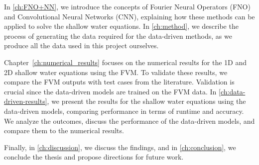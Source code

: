 In \autoref{ch:FNO+NN}, we introduce the concepts of Fourier Neural Operators (FNO) and Convolutional Neural Networks (CNN), explaining how these methods can be applied to solve the shallow water equations.
In \autoref{ch:method}, we describe the process of generating the data required for the data-driven methods, as we produce all the data used in this project ourselves.

Chapter~\ref{ch:numerical_results} focuses on the numerical results for the 1D and 2D shallow water equations using the FVM.
To validate these results, we compare the FVM outputs with test cases from the literature. Validation is crucial since the data-driven models are trained on the FVM data.
In \autoref{ch:data-driven-results}, we present the results for the shallow water equations using the data-driven models, comparing performance in terms of runtime and accuracy.
We analyze the outcomes, discuss the performance of the data-driven models, and compare them to the numerical results.

Finally, in \autoref{ch:discussion}, we discuss the findings, and in \autoref{ch:conclusion}, we conclude the thesis and propose directions for future work.



